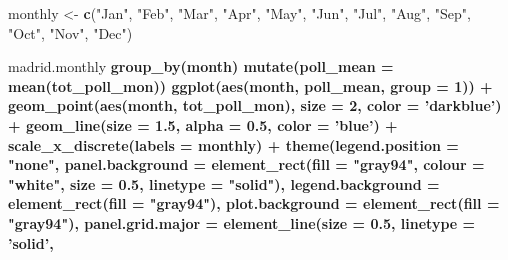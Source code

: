\documentclass[
]{article}
\newenvironment{Shaded}{\begin{snugshade}}{\end{snugshade}}
\newcommand{\DataTypeTok}[1]{\textcolor[rgb]{0.13,0.29,0.53}{#1}}
\newcommand{\DecValTok}[1]{\textcolor[rgb]{0.00,0.00,0.81}{#1}}
\newcommand{\FloatTok}[1]{\textcolor[rgb]{0.00,0.00,0.81}{#1}}
\newcommand{\KeywordTok}[1]{\textcolor[rgb]{0.13,0.29,0.53}{\textbf{#1}}}
\newcommand{\NormalTok}[1]{#1}
\newcommand{\OperatorTok}[1]{\textcolor[rgb]{0.81,0.36,0.00}{\textbf{#1}}}
\newcommand{\StringTok}[1]{\textcolor[rgb]{0.31,0.60,0.02}{#1}}
\begin{document}
\begin{Shaded}
\begin{Highlighting}[]
\NormalTok{monthly <-}\StringTok{ }\KeywordTok{c}\NormalTok{(}\StringTok{"Jan"}\NormalTok{, }\StringTok{"Feb"}\NormalTok{, }\StringTok{"Mar"}\NormalTok{, }\StringTok{"Apr"}\NormalTok{, }\StringTok{"May"}\NormalTok{, }\StringTok{"Jun"}\NormalTok{, }\StringTok{"Jul"}\NormalTok{, }\StringTok{"Aug"}\NormalTok{, }\StringTok{"Sep"}\NormalTok{, }\StringTok{"Oct"}\NormalTok{, }\StringTok{"Nov"}\NormalTok{, }\StringTok{"Dec"}\NormalTok{)}

\NormalTok{madrid.monthly }\OperatorTok{%>%}
\StringTok{  }\KeywordTok{group_by}\NormalTok{(month) }\OperatorTok{%>%}
\StringTok{  }\KeywordTok{mutate}\NormalTok{(}\DataTypeTok{poll_mean =} \KeywordTok{mean}\NormalTok{(tot_poll_mon)) }\OperatorTok{%>%}
\StringTok{  }\KeywordTok{ggplot}\NormalTok{(}\KeywordTok{aes}\NormalTok{(month, poll_mean, }\DataTypeTok{group =} \DecValTok{1}\NormalTok{)) }\OperatorTok{+}\StringTok{ }
\StringTok{    }\KeywordTok{geom_point}\NormalTok{(}\KeywordTok{aes}\NormalTok{(month, tot_poll_mon), }\DataTypeTok{size =} \DecValTok{2}\NormalTok{, }\DataTypeTok{color =} \StringTok{'darkblue'}\NormalTok{) }\OperatorTok{+}\StringTok{ }
\StringTok{    }\KeywordTok{geom_line}\NormalTok{(}\DataTypeTok{size =} \FloatTok{1.5}\NormalTok{, }\DataTypeTok{alpha =} \FloatTok{0.5}\NormalTok{, }\DataTypeTok{color =} \StringTok{'blue'}\NormalTok{) }\OperatorTok{+}
\StringTok{    }\KeywordTok{scale_x_discrete}\NormalTok{(}\DataTypeTok{labels =}\NormalTok{ monthly) }\OperatorTok{+}
\StringTok{    }\KeywordTok{theme}\NormalTok{(}\DataTypeTok{legend.position =} \StringTok{"none"}\NormalTok{,}
        \DataTypeTok{panel.background =} \KeywordTok{element_rect}\NormalTok{(}\DataTypeTok{fill =} \StringTok{"gray94"}\NormalTok{, }
                                        \DataTypeTok{colour =} \StringTok{"white"}\NormalTok{,}
                                        \DataTypeTok{size =} \FloatTok{0.5}\NormalTok{, }
                                        \DataTypeTok{linetype =} \StringTok{"solid"}\NormalTok{),}
        \DataTypeTok{legend.background =} \KeywordTok{element_rect}\NormalTok{(}\DataTypeTok{fill =} \StringTok{"gray94"}\NormalTok{),}
        \DataTypeTok{plot.background =} \KeywordTok{element_rect}\NormalTok{(}\DataTypeTok{fill =} \StringTok{"gray94"}\NormalTok{),}
        \DataTypeTok{panel.grid.major =} \KeywordTok{element_line}\NormalTok{(}\DataTypeTok{size =} \FloatTok{0.5}\NormalTok{, }
                                        \DataTypeTok{linetype =} \StringTok{'solid'}\NormalTok{, }
}}}
\end{Highlighting}
\end{Shaded}
\end{document}
